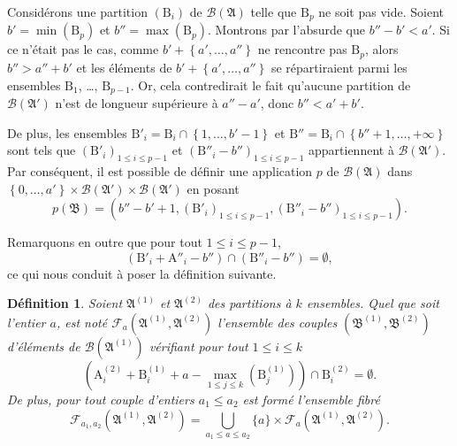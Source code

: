 \documentclass[11pt, oneside]{article}   	%
\newcommand{\interval}[2]{\left\{ #1, \dots, #2 \right\}}
\newtheorem{definition}{Définition}
\begin{document}
Considérons une partition $(\mathrm{B}_i)$ de $\mathcal{B}(\mathfrak{A})$ telle que $\mathrm{B}_p$ ne soit pas vide.
Soient $b' = \min(\mathrm{B}_p)$ et $b'' = \max(\mathrm{B}_p)$.
Montrons par l'absurde que $b'' - b' < a'$.
Si ce n'était pas le cas, comme $b' + \interval{a'}{a''}$ ne rencontre pas $\mathrm{B}_p$, alors $b'' > a'' + b'$
et les éléments de $b' + \interval{a'}{a''}$ se répartiraient parmi les ensembles $\mathrm{B}_1$, …, $\mathrm{B}_{p-1}$.
Or, cela contredirait le fait qu'aucune partition de $\mathcal{B}(\mathfrak{A}')$ n'est de longueur supérieure à $a'' - a'$, donc $b'' < a' + b'$.

De plus, les ensembles $\mathrm{B}'_i = \mathrm{B}_i \cap \interval{1}{b' - 1}$ et $\mathrm{B}'' = \mathrm{B}_i \cap \interval{b''+1}{+\infty}$
sont tels que $(\mathrm{B}'_i)_{1 \leqslant i \leqslant p-1}$ et $(\mathrm{B}''_i - b'')_{1 \leqslant i \leqslant p-1}$ appartiennent à $\mathcal{B}(\mathfrak{A}')$.
Par conséquent, il est possible de définir une application $p$
de $\mathcal{B}(\mathfrak{A})$ dans $\interval{0}{a'} \times \mathcal{B}(\mathfrak{A}') \times \mathcal{B}(\mathfrak{A}')$
en posant
\begin{equation}
 p(\mathfrak{B}) = ( b'' - b' + 1, (\mathrm{B}'_i)_{1 \leqslant i \leqslant p-1}, (\mathrm{B}''_i - b'')_{1 \leqslant i \leqslant p-1}).
\end{equation}

Remarquons en outre que pour tout $1 \leqslant i \leqslant p-1$,
\begin{equation}
 (\mathrm{B}'_i + \mathrm{A}''_i - b'') \cap (\mathrm{B}''_i - b'') = \emptyset,
\end{equation}
ce qui nous conduit à poser la définition suivante.

\begin{definition}
Soient $\mathfrak{A}^{(1)}$ et $\mathfrak{A}^{(2)}$ des partitions à $k$ ensembles.
Quel que soit l'entier $a$, est noté $\mathcal{F}_a(\mathfrak{A}^{(1)}, \mathfrak{A}^{(2)})$ l'ensemble des couples
$(\mathfrak{B}^{(1)}, \mathfrak{B}^{(2)})$ d'éléments de $\mathcal{B}(\mathfrak{A}^{(1)})$ vérifiant pour tout $1 \leqslant i \leqslant k$
\begin{equation}
 \left( \mathrm{A}_i^{(2)} + \mathrm{B}_i^{(1)} + a - \max_{1 \leqslant j \leqslant k} \left( \mathrm{B}_j^{(1)} \right) \right) \cap \mathrm{B}_i^{(2)} = \emptyset.
\end{equation}
De plus, pour tout couple d'entiers $a_1 \leqslant a_2$ est formé l'ensemble fibré
\begin{equation}
 \mathcal{F}_{a_1, a_2}(\mathfrak{A}^{(1)}, \mathfrak{A}^{(2)}) =
 \bigcup_{a_1 \leqslant a \leqslant a_2} \{a\} \times \mathcal{F}_a (\mathfrak{A}^{(1)}, \mathfrak{A}^{(2)}).
\end{equation}
\end{definition}
\end{document}
